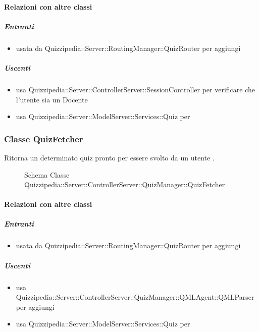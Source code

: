 \paragraph{Relazioni con altre classi}
\subparagraph{Entranti}
\begin{itemize}
\item usata da Quizzipedia::Server::RoutingManager::QuizRouter per aggiungi
\end{itemize}
\subparagraph{Uscenti}
\begin{itemize}
\item usa Quizzipedia::Server::ControllerServer::SessionController per verificare che l'utente sia un Docente
\item usa Quizzipedia::Server::ModelServer::Services::Quiz per 
\end{itemize}
\subsubsection{Classe QuizFetcher}
Ritorna un determinato quiz pronto per essere svolto da un utente .
\begin{figure}[H]
\centering
\noindent{}
\caption[Schema Classe QuizFetcher]{Schema Classe Quizzipedia::Server::ControllerServer::QuizManager::QuizFetcher}
\end{figure}
\paragraph{Relazioni con altre classi}
\subparagraph{Entranti}
\begin{itemize}
\item usata da Quizzipedia::Server::RoutingManager::QuizRouter per aggiungi
\end{itemize}
\subparagraph{Uscenti}
\begin{itemize}
\item usa Quizzipedia::Server::ControllerServer::QuizManager::QMLAgent::QMLParser per aggiungi
\item usa Quizzipedia::Server::ModelServer::Services::Quiz per 
\end{itemize}
